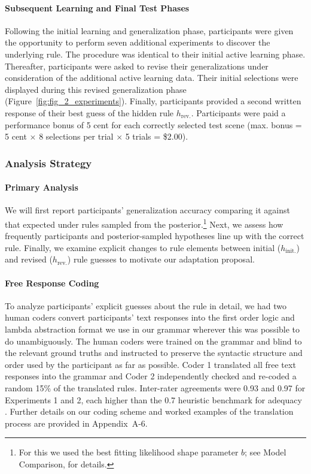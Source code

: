 \documentclass[doc,natbib,floatsintext]{apa7}
\newcommand{\hr}{h_{\mathrm{rev.}}}
\newcommand{\hi}{h_{\mathrm{init.}}}
\begin{document}
\paragraph{Subsequent Learning and Final Test Phases}
Following the initial learning and generalization phase, participants were given the opportunity to perform seven additional experiments to discover the underlying rule. The procedure was identical to their initial active learning phase. Thereafter, participants were asked to revise their generalizations under consideration of the additional active learning data. Their initial selections were displayed during this revised generalization phase (Figure~\ref{fig:fig_2_experiments}). Finally, participants provided a second written response of their best guess of the hidden rule $\hr$. Participants were paid a performance bonus of 5 cent for each correctly selected test scene (max. bonus = 5 cent $\times$ 8 selections per trial $\times$ 5 trials = \$2.00).


\subsubsection{Analysis Strategy}
\paragraph{Primary Analysis}
We will first report participants' generalization accuracy comparing it against that expected under rules sampled from the posterior.\footnote{For this we used the best fitting likelihood shape parameter $b$; see Model Comparison, for details.} Next, we assess how frequently participants and posterior-sampled hypotheses line up with the correct rule. Finally, we examine explicit changes to rule elements between initial ($\hi$) and revised ($\hr$) rule guesses to motivate our adaptation proposal.

\paragraph{Free Response Coding}
To analyze participants' explicit guesses about the rule in detail, we had two human coders convert participants' text responses into the first order logic and lambda abstraction format we use in our grammar wherever this was possible to do unambiguously. The human coders were trained on the grammar and blind to the relevant ground truths and instructed to preserve the syntactic structure and order used by the participant as far as possible. Coder 1 translated all free text responses into the grammar and Coder 2 independently checked and re-coded a random 15\% of the translated rules. Inter-rater agreements were 0.93 and 0.97 for Experiments 1 and 2, each higher than the 0.7 heuristic benchmark for adequacy \citep{krippendorff2018content}. Further details on our coding scheme and worked examples of the translation process are provided in Appendix~A-6.
\end{document}
